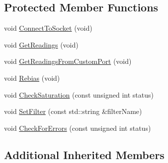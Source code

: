 \subsection*{Protected Member Functions}
\begin{DoxyCompactItemize}
\item 
void \hyperlink{classmts_a_t_i_net_f_t_sensor_a391a74b9c0e746c8014df3df7958a7b2}{Connect\-To\-Socket} (void)
\item 
void \hyperlink{classmts_a_t_i_net_f_t_sensor_adbf21a545ccd22da52a765e93d469f1c}{Get\-Readings} (void)
\item 
void \hyperlink{classmts_a_t_i_net_f_t_sensor_afc4c4657b4fb4623cc633e0ac5ee2093}{Get\-Readings\-From\-Custom\-Port} (void)
\item 
void \hyperlink{classmts_a_t_i_net_f_t_sensor_a849f04c5faa61544bd1dc44546d65513}{Rebias} (void)
\item 
void \hyperlink{classmts_a_t_i_net_f_t_sensor_a10fcccbd342a91919438a564b170e772}{Check\-Saturation} (const unsigned int status)
\item 
void \hyperlink{classmts_a_t_i_net_f_t_sensor_a15930377aaa14ba83a03dc94f193e943}{Set\-Filter} (const std\-::string \&filter\-Name)
\item 
void \hyperlink{classmts_a_t_i_net_f_t_sensor_a51f51610c48d854dff13db55b505c372}{Check\-For\-Errors} (const unsigned int status)
\end{DoxyCompactItemize}
\subsection*{Additional Inherited Members}


